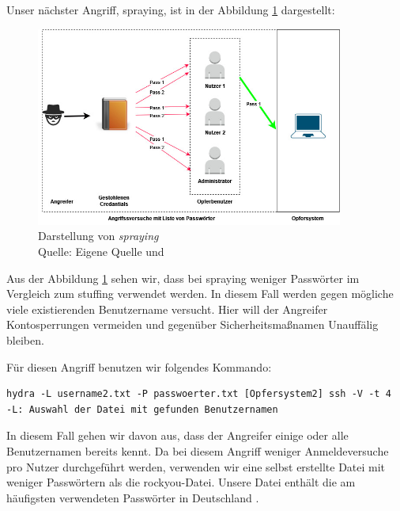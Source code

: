 Unser nächster Angriff, \gls{spraying}, ist in der Abbildung \ref{fig:spraying} dargestellt:
\begin{figure}[H]
   \centering
   \includegraphics[width=0.9\textwidth]{assets/Spraying.jpg}
   \caption[Darstellung von \textit{\gls{spraying}}]
   {Darstellung von \textit{\gls{spraying}}\\Quelle: Eigene Quelle und \citep{Swathi_spraxy}}
   \label{fig:spraying}
   \centering
\end{figure}

Aus der Abbildung \ref{fig:spraying} sehen wir, dass bei \gls{spraying} weniger Passwörter im Vergleich zum \gls{stuffing} verwendet werden. In diesem Fall werden gegen mögliche viele existierenden Benutzername versucht. Hier will der Angreifer  Kontosperrungen vermeiden und gegenüber Sicherheitsmaßnamen Unauffälig bleiben. 

Für diesen Angriff benutzen wir folgendes Kommando:
{
\begin{Verbatim}[frame=single]
hydra -L username2.txt -P passwoerter.txt [Opfersystem2] ssh -V -t 4
-L: Auswahl der Datei mit gefunden Benutzernamen
\end{Verbatim}
}

In diesem Fall gehen wir davon aus, dass der Angreifer einige oder alle Benutzernamen bereits kennt. Da bei diesem Angriff weniger Anmeldeversuche pro Nutzer durchgeführt werden, verwenden wir eine selbst erstellte Datei mit weniger Passwörtern als die \gls{rockyou}-Datei. Unsere Datei enthält die am häufigsten verwendeten Passwörter in Deutschland \citep{silicon_passwort}.

